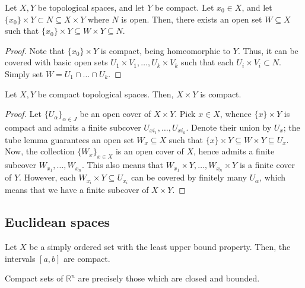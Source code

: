 \documentclass[11pt]{article}
\newcommand{\R}{\mathbb{R}}
\theoremstyle{definition}
\theoremstyle{remark}
\numberwithin{equation}{section}
\begin{document}
    \begin{lemma}
        Let $X, Y$ be topological spaces, and let $Y$ be compact. Let $x_0 \in X$,
        and let $\{x_0\} \times Y \subset N \subseteq X \times Y$ where $N$ is open.
        Then, there exists an open set $W \subseteq X$ such that $\{x_0\} \times Y
        \subseteq W \times Y \subseteq N$.
    \end{lemma}
    \begin{proof}
        Note that $\{x_0\}\times Y$ is compact, being homeomorphic to $Y$. Thus, it
        can be covered with basic open sets $U_1\times V_1, \dots, U_k\times V_k$
        such that each $U_i \times V_i \subset N$. Simply set $W = U_1 \cap \dots
        \cap U_k$.
    \end{proof}

    \begin{theorem}
        Let $X, Y$ be compact topological spaces. Then, $X \times Y$ is compact.
    \end{theorem}
    \begin{proof}
        Let $\{U_\alpha\}_{\alpha \in J}$ be an open cover of $X \times Y$. Pick $x
        \in X$, whence $\{x\} \times Y$ is compact and admits a finite subcover
        $U_{xi_1}, \dots, U_{xi_k}$. Denote their union by $U_x$; the tube lemma
        guarantees an open set $W_x \subseteq X$ such that $\{x\} \times Y \subseteq
        W\times Y \subseteq U_x$. Now, the collection $\{W_x\}_{x \in X}$ is an open
        cover of $X$, hence admits a finite subcover $W_{x_1}, \dots, W_{x_n}$. This
        also means that $W_{x_1}\times Y, \dots, W_{x_n} \times Y$ is a finite cover
        of $Y$. However, each $W_{x_i} \times Y \subseteq U_{x_i}$ can be covered by
        finitely many $U_\alpha$, which means that we have a finite subcover of $X
        \times Y$.
    \end{proof}


    \subsection{Euclidean spaces}

    \begin{lemma}
        Let $X$ be a simply ordered set with the least upper bound property. Then,
        the intervals $[a, b]$ are compact.
    \end{lemma}

    \begin{theorem}
        Compact sets of $\R^n$ are precisely those which are closed and bounded.        
    \end{theorem}
\end{document}
